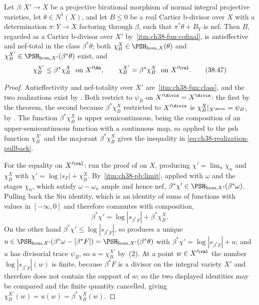 \begin{corollary}
\label{cor:ch38-realization-pullback}
Let $\beta:X'\to X$ be a projective birational morphism of normal
integral projective varieties, let $\theta\in N^1(X)$, and let
$B\leq0$ be a real Cartier b-divisor over $X$ with a determination
$\pi:Y\to X$ factoring through $\beta$, such that
$\pi^*\theta+B_Y$ is nef.  Then $B$, regarded as a Cartier b-divisor
over $X'$ by
\,\cref{itm:ch38-fun:cofinal}, is
antieffective and nef-total in the class $\beta^*\theta$; both
$\chi^X_B\in\PSH_{\mathrm{hom},X}(\theta)$ and
$\chi^{X'}_B\in\PSH_{\mathrm{hom},X'}(\beta^*\theta)$ exist, and
\[
 \chi^{X'}_B\leq\beta^*\chi^X_B\ \text{ on }X'^{\An},
 \qquad
 \chi^{X'}_B=\beta^*\chi^X_B\ \text{ on }X'^{\val}.
\tag{38.47}\label{eq:ch38-realization-pullback}
\]
\end{corollary}

\begin{proof}
Antieffectivity and nef-totality over $X'$ are
\,\cref{itm:ch38-fun:class}, and the
two realizations exist by .  Both
restrict to $\psi_B$ on $X'^{\divis}=X^{\divis}$: the first by the
theorem, the second because
$\beta^*\chi^X_B$ restricted to $X'^{\divis}$ is
$\chi^X_B|_{X^{\divis}}=\psi_B$, by
.  The function $\beta^*\chi^X_B$ is
upper semicontinuous, being the composition of an upper-semicontinuous
function with a continuous map, so
 applied to the psh function
$\chi^{X'}_B$ and the majorant $\beta^*\chi^X_B$ gives the inequality
in \eqref{eq:ch38-realization-pullback}.

For the equality on $X'^{\val}$: run the proof of
 on $X$, producing
$\chi'=\lim_n\chi_n$ and $\chi^X_B$ with
$\chi'=\log|s_F|+\chi^X_B$.  By
\,\cref{itm:ch38-pb:limit}, applied with
$\omega$ and the stages $\chi_n$, which satisfy
$\omega-\omega_n$ ample and hence nef,
$\beta^*\chi'\in\PSH_{\mathrm{hom},X'}(\beta^*\omega)$.  Pulling back the
Siu identity, which is an identity of sums of functions with values in
$[-\infty,0]$ and therefore commutes with composition,
\[
 \beta^*\chi'=\log|s_{\beta^*F}|+\beta^*\chi^X_B .
\]
On the other hand $\beta^*\chi'\leq\log|s_{\beta^*F}|$, so
 produces a unique
$u\in\PSH_{\mathrm{hom},X'}(\beta^*\omega-[\beta^*F])
=\PSH_{\mathrm{hom},X'}(\beta^*\theta)$ with
$\beta^*\chi'=\log|s_{\beta^*F}|+u$; and $u$ has divisorial trace
$\psi_B$, so $u=\chi^{X'}_B$ by
\,(2).  At a point
$w\in X'^{\val}$ the number $\log|s_{\beta^*F}|(w)$ is finite, because
$\beta^*F$ is a divisor on the integral variety $X'$ and therefore does
not contain the support of $w$; so the two displayed identities may be
compared and the finite quantity cancelled, giving
$\chi^{X'}_B(w)=u(w)=\beta^*\chi^X_B(w)$.
\end{proof}

